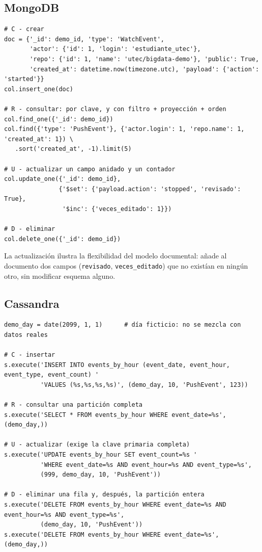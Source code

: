 \subsection{MongoDB}

\begin{lstlisting}[style=py]
# C - crear
doc = {'_id': demo_id, 'type': 'WatchEvent',
       'actor': {'id': 1, 'login': 'estudiante_utec'},
       'repo': {'id': 1, 'name': 'utec/bigdata-demo'}, 'public': True,
       'created_at': datetime.now(timezone.utc), 'payload': {'action': 'started'}}
col.insert_one(doc)

# R - consultar: por clave, y con filtro + proyección + orden
col.find_one({'_id': demo_id})
col.find({'type': 'PushEvent'}, {'actor.login': 1, 'repo.name': 1, 'created_at': 1}) \
   .sort('created_at', -1).limit(5)

# U - actualizar un campo anidado y un contador
col.update_one({'_id': demo_id},
               {'$set': {'payload.action': 'stopped', 'revisado': True},
                '$inc': {'veces_editado': 1}})

# D - eliminar
col.delete_one({'_id': demo_id})
\end{lstlisting}

La actualización ilustra la flexibilidad del modelo documental: añade al documento dos campos (\texttt{revisado}, \texttt{veces\_editado}) que no existían en ningún otro, sin modificar esquema alguno.

\subsection{Cassandra}

\begin{lstlisting}[style=py]
demo_day = date(2099, 1, 1)      # día ficticio: no se mezcla con datos reales

# C - insertar
s.execute('INSERT INTO events_by_hour (event_date, event_hour, event_type, event_count) '
          'VALUES (%s,%s,%s,%s)', (demo_day, 10, 'PushEvent', 123))

# R - consultar una partición completa
s.execute('SELECT * FROM events_by_hour WHERE event_date=%s', (demo_day,))

# U - actualizar (exige la clave primaria completa)
s.execute('UPDATE events_by_hour SET event_count=%s '
          'WHERE event_date=%s AND event_hour=%s AND event_type=%s',
          (999, demo_day, 10, 'PushEvent'))

# D - eliminar una fila y, después, la partición entera
s.execute('DELETE FROM events_by_hour WHERE event_date=%s AND event_hour=%s AND event_type=%s',
          (demo_day, 10, 'PushEvent'))
s.execute('DELETE FROM events_by_hour WHERE event_date=%s', (demo_day,))
\end{lstlisting}

